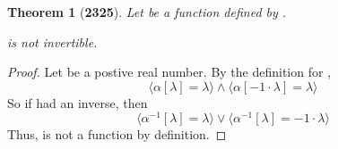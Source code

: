\documentclass[preview]{standalone}
\newtheorem{theorem}{Theorem}
\begin{document}
\begin{theorem}[\textbf{2325}]
    Let \bm{$\alpha$} be a function 
    defined by \bm{$\alpha[\lambda] = |\lambda|$}. 
    \begin{center}
        \bm{$\alpha[\lambda]$} is not invertible.
    \end{center}
\end{theorem}

\begin{proof}
    Let \bm{$\lambda$} be a postive real number. 
    By the definition for \bm{$\alpha$}, 
    \begin{equation*}
        \Big \langle \alpha[\lambda] = \lambda \Big \rangle
            \land
        \Big \langle \alpha[-1 \cdot \lambda] = \lambda \Big \rangle
    \end{equation*}
    So if \bm{$\alpha$} had an inverse, then
    \begin{equation*}
        \Big \langle \alpha ^{-1}[\lambda] = \lambda \Big \rangle
            \lor 
        \Big \langle \alpha ^{-1}[\lambda] = -1 \cdot \lambda \Big \rangle
    \end{equation*}
    Thus,  is not a function by definition.
\end{proof}
\end{document}

